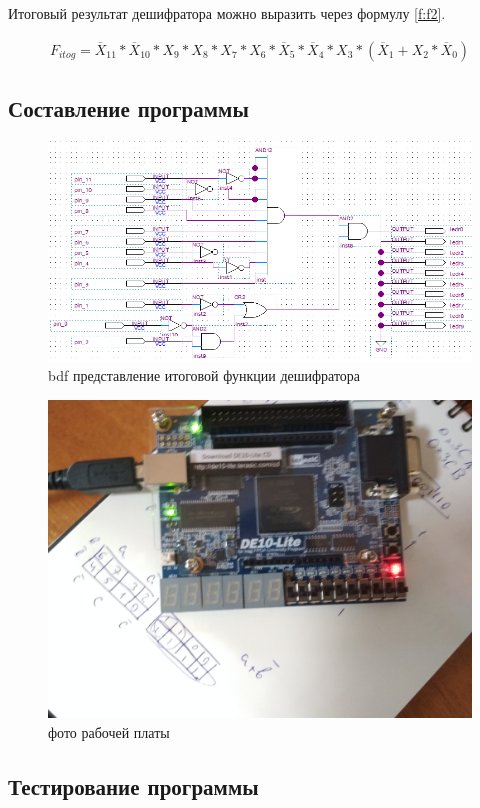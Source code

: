 \documentclass[a4paper,14pt]{article}
\begin{document}
Итоговый результат дешифратора можно выразить через формулу \ref{f:f2}.

\begin{equation}
\label{f:f2}
\begin{gathered}
F_{itog} = \overline X_{11} * \overline X_{10} * X_9 * X_8 * X_7 * X_6 * \overline X_5 * \overline X_4 * X_3 * (\overline X_1 + X_2 * \overline X_0)
\end{gathered}
\end{equation}

\subsection{Составление программы}

	\begin{figure}[H]
		\centering
		\includegraphics[width=0.7\linewidth]{image/03_bdf}
		\caption{bdf представление итоговой функции дешифратора}
		\label{fig:03bdf}
	\end{figure}

	\begin{figure}[H]
		\centering
		\includegraphics[width=0.7\linewidth]{image/03_foto.JPG}
		\caption{фото рабочей платы}
		\label{fig:03foto}
	\end{figure}

\subsection{Тестирование программы}
\end{document}
